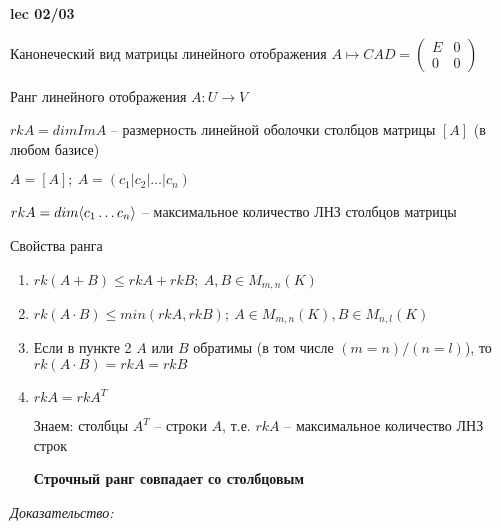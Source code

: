 \documentclass[12pt]{article}
\begin{document}
\textbf{\todo lec 02/03}

\begin{defin}{Канонеческий вид матрицы линейного отображения}
    $A \mapsto CAD = \begin{pmatrix}
        E & 0 \\
        0 & 0
    \end{pmatrix}$
\end{defin}

\begin{defin}{Ранг линейного отображения}
    $A : U \rightarrow V$

    $rkA = dimImA$ -- размерность линейной оболочки столбцов матрицы $[A]$ (в любом базисе)

    $A = [A];\ A = (c_1 | c_2 | \ldots | c_n)$

    $rkA = dim\langle c_1 \ldots c_n \rangle$ -- максимальное количество ЛНЗ столбцов матрицы
\end{defin}

\begin{theo}{Свойства ранга}
    \begin{enumerate}
        \item $rk(A + B) \leq rkA + rkB;\ A, B \in M_{m, n}(K)$
        \item $rk(A \cdot B) \leq min(rkA, rkB);\ A \in M_{m, n}(K), B \in M_{n, l}(K)$
        \item Если в пункте 2 $A$ или $B$ обратимы (в том числе $(m = n)/(n = l)$), то \\ $rk(A \cdot B) = rkA = rkB$
        \item $rkA = rkA^T$
        
        \begin{Remark}{}
            Знаем: столбцы $A^T$ -- строки $A$, т.е. $rkA$ -- максимальное количество ЛНЗ строк

            \textbf{Строчный ранг совпадает со столбцовым}
        \end{Remark}
    \end{enumerate}
\end{theo}

\textit{Доказательство:}
\end{document}
